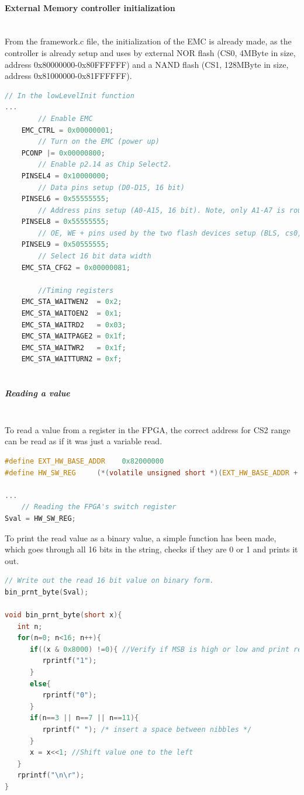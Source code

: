 \paragraph{External Memory controller initialization}\textbf{ }\\
From the framework.c file, the initialization of the EMC is already made, as the controller is already setup and uses by external NOR flash (CS0, 4MByte in size, address 0x80000000-0x80FFFFFF) and a NAND flash (CS1, 128MByte in size, address 0x81000000-0x81FFFFFF).
\begin{lstlisting}[language=c]
// In the lowLevelInit function
...
		// Enable EMC
	EMC_CTRL = 0x00000001;
		// Turn on the EMC (power up)
	PCONP |= 0x00000800;
		// Enable p2.14 as Chip Select2.
	PINSEL4 = 0x10000000;
		// Data pins setup (D0-D15, 16 bit) 
	PINSEL6 = 0x55555555;
		// Address pins setup (A0-A15, 16 bit). Note, only A1-A7 is routed to the FPGA.
	PINSEL8 = 0x55555555;
		// OE, WE + pins used by the two flash devices setup (BLS, cs0, cs1, A16-A19).
	PINSEL9 = 0x50555555; 
		// Select 16 bit data width 
	EMC_STA_CFG2 = 0x00000081;
		
		//Timing registers
	EMC_STA_WAITWEN2  = 0x2;
	EMC_STA_WAITOEN2  = 0x1;
	EMC_STA_WAITRD2   = 0x03;
	EMC_STA_WAITPAGE2 = 0x1f;
	EMC_STA_WAITWR2   = 0x1f;
	EMC_STA_WAITTURN2 = 0xf;
	
\end{lstlisting}

\subparagraph{Reading a value}\textbf{ }\\
To read a value from a register in the FPGA, the correct address for CS2 range can be read as if it was just a variable read.
\begin{lstlisting}[language=c]
#define EXT_HW_BASE_ADDR	0x82000000
#define HW_SW_REG     (*(volatile unsigned short *)(EXT_HW_BASE_ADDR + 64))

...
	// Reading the FPGA's switch register
Sval = HW_SW_REG;
\end{lstlisting}
To print the read value as a binary value, a simple function has been made, which goes through all 16 bits in the string, checks if they are 0 or 1 and prints it out. 
\begin{lstlisting}[language=c]
	// Write out the read 16 bit value on binary form.
bin_prnt_byte(Sval);

void bin_prnt_byte(short x){
   int n;
   for(n=0; n<16; n++){
      if((x & 0x8000) !=0){	//Verify if MSB is high or low and print result
         rprintf("1");
      }
      else{
         rprintf("0");
      }
      if(n==3 || n==7 || n==11){
         rprintf(" "); /* insert a space between nibbles */
      }
      x = x<<1;	//Shift value one to the left
   }
   rprintf("\n\r");
}
\end{lstlisting}

